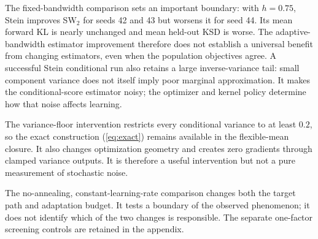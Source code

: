 \documentclass[11pt,a4paper]{article}
\numberwithin{equation}{section}
\begin{document}
The fixed-bandwidth comparison sets an important boundary: with $h=0.75$,
Stein improves SW$_2$ for seeds 42 and 43 but worsens it for seed 44.
Its mean forward KL is nearly unchanged and mean held-out KSD is worse.
The adaptive-bandwidth estimator improvement therefore does not establish
a universal benefit from changing estimators, even when the population
objectives agree. A successful Stein conditional run also retains a large
inverse-variance tail: small component variance does not itself imply poor
marginal approximation. It makes the conditional-score estimator noisy;
the optimizer and kernel policy determine how that noise affects learning.

The variance-floor intervention restricts every conditional variance to at
least $0.2$, so the exact construction (\ref{eq:exact}) remains available in
the flexible-mean closure. It also changes optimization geometry and creates
zero gradients through clamped variance outputs. It is therefore a useful
intervention but not a pure measurement of stochastic noise.

The no-annealing, constant-learning-rate comparison changes both the target
path and adaptation budget. It tests a boundary of the observed phenomenon;
it does not identify which of the two changes is responsible. The separate
one-factor screening controls are retained in the appendix.
\end{document}
